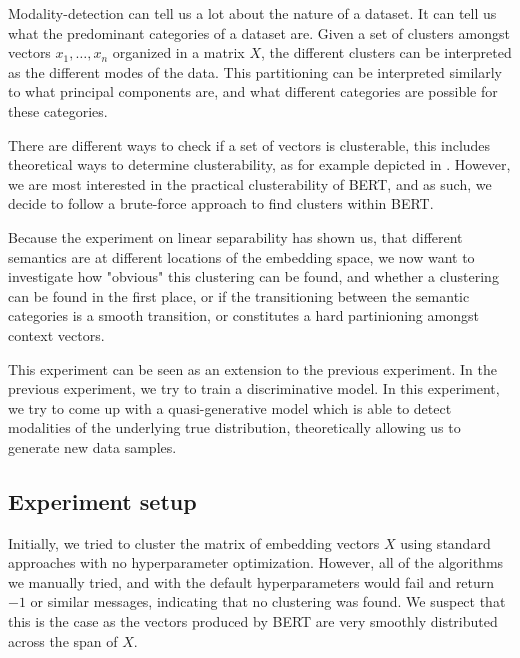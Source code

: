 \documentclass[a4paper,12pt,twoside,openright]{report}
\begin{document}
Modality-detection can tell us a lot about the nature of a dataset.
It can tell us what the predominant categories of a dataset are.
Given a set of clusters amongst vectors $x_1, \ldots, x_n$ organized in a matrix $X$, the different clusters can be interpreted as the different modes of the data.
This partitioning can be interpreted similarly to what principal components are, and what different categories are possible for these categories.

There are different ways to check if a set of vectors is clusterable, this includes theoretical ways to determine clusterability, as for example depicted in \cite{ackerman09, mccarthy16}. 
However, we are most interested in the practical clusterability of BERT, and as such, we decide to follow a brute-force approach to find clusters within BERT.

Because the experiment on linear separability has shown us, that different semantics are at different locations of the embedding space, we now want to investigate how "obvious" this clustering can be found, and whether a clustering can be found in the first place, or if the transitioning between the semantic categories is a smooth transition, or constitutes a hard partinioning amongst context vectors.

This experiment can be seen as an extension to the previous experiment.
In the previous experiment, we try to train a discriminative model.
In this experiment, we try to come up with a quasi-generative model which is able to detect modalities of the underlying true distribution, theoretically allowing us to generate new data samples.

\subsection{Experiment setup}

Initially, we tried to cluster the matrix of embedding vectors $X$ using standard approaches with no hyperparameter optimization. 
However, all of the algorithms we manually tried, and with the default hyperparameters would fail and return $-1$ or similar messages, indicating that no clustering was found.
We suspect that this is the case as the vectors produced by BERT are very smoothly distributed across the span of $X$. \\
\end{document}
